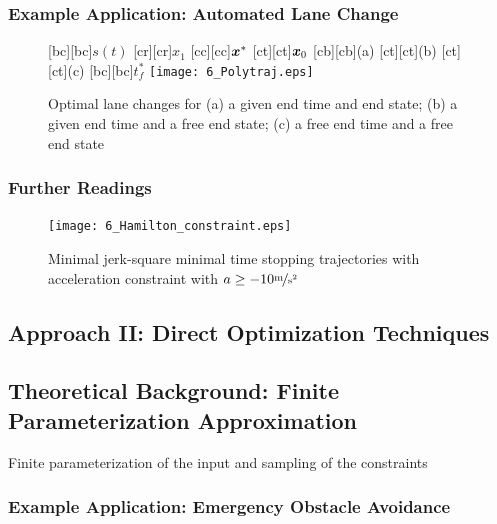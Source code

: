 \subsubsection{Example Application: Automated Lane Change}\label{S:57.3.1.2}

\begin{figure}[h]
\centering
	[bc][bc]{$s(t)$}
	[cr][cr]{$x_1$}
	[cc][cc]{$\boldsymbol{x}^\ast$}
	[ct][ct]{$\boldsymbol{x}_0$}
	[cb][cb]{\scriptsize (a)}
	[ct][ct]{\scriptsize (b)}
	[ct][ct]{\scriptsize (c)}
	[bc][bc]{$t_f^\ast$}
	\centering
  	\texttt{[image: 6\_Polytraj.eps]}
  \caption{Optimal lane changes for (a) a given end time and end state; (b) a given end time and a free end state; (c) a free end time and a free end state}
    \label{fig:polytraj}
\end{figure}

\subsubsection{Further Readings}\label{S:57.3.1.3}


\begin{figure}[ht]
\centering

\renewcommand{\matlabtextA}{\normalsize }
	\def\ylabelV{$x_2$ in $\unitfrac{m}{s}$}
	\def\ylabelA{$x_3$ in $\unitfrac{m}{s^2}$}
	\def\xlabelT{$t$ in $\unit{s}$}
	\def\xlabelX{$x_1$ in $\unit{m}$}
	\centering
  	\texttt{[image: 6\_Hamilton\_constraint.eps]}
  \caption{Minimal jerk-square minimal time stopping trajectories with acceleration constraint with $a\geq -10 \unitfrac{m}{s^2}$}
    \label{fig:poly_mit_unb}
\end{figure}



\subsection{Approach II: Direct Optimization Techniques}\label{S:57.3.2}
\subsection{	Theoretical Background: Finite Parameterization Approximation}\label{S:57.3.2.1}


Finite parameterization of the input and sampling of the constraints

\subsubsection{Example Application: Emergency Obstacle Avoidance}\label{S:57.3.2.2}


